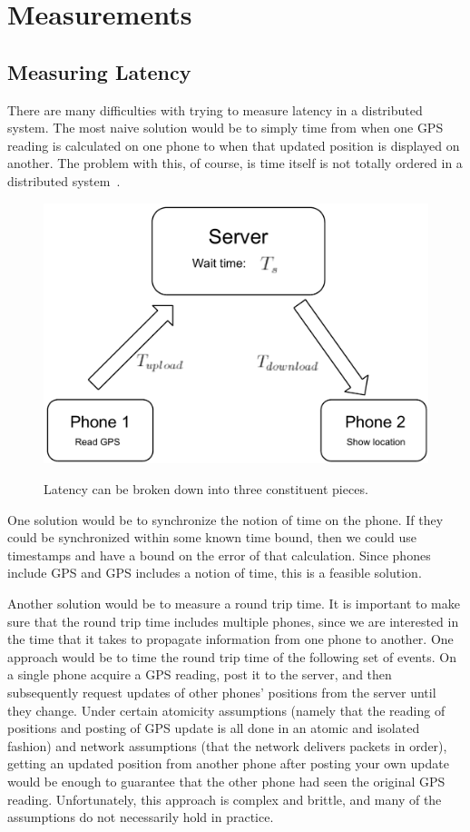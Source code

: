 \documentclass{acm_proc_article-sp}
\begin{document}
\section{Measurements}
\subsection{Measuring Latency}

There are many difficulties with trying to measure latency in a distributed system.  The most naive solution would be to simply time from when one GPS reading is calculated on one phone to when that updated position is displayed on another. The problem with this, of course, is time itself is not totally ordered in a distributed system~\cite{Lamport:1978:TCO}.

\begin{figure}
\centering
\includegraphics[scale=0.4]{figs/LatencyExplanation}
\label{fig:LatencyExplanation}
\caption{Latency can be broken down into three constituent pieces.}
\end{figure}

One solution would be to synchronize the notion of time on the phone.  If they could be synchronized within some known time bound, then we could use timestamps and have a bound on the error of that calculation.  Since phones include GPS and GPS includes a notion of time, this is a feasible solution.

Another solution would be to measure a round trip time.  It is important to make sure that the round trip time includes multiple phones, since we are interested in the time that it takes to propagate information from one phone to another.  One approach would be to time the round trip time of the following set of events.  On a single phone acquire a GPS reading, post it to the server, and then subsequently request updates of other phones' positions from the server until they change.  Under certain atomicity assumptions (namely that the reading of positions and posting of GPS update is all done in an atomic and isolated fashion) and network assumptions (that the network delivers packets in order), getting an updated position from another phone after posting your own update would be enough to guarantee that the other phone had seen the original GPS reading.  Unfortunately, this approach is complex and brittle, and many of the assumptions do not necessarily hold in practice.
\end{document}
